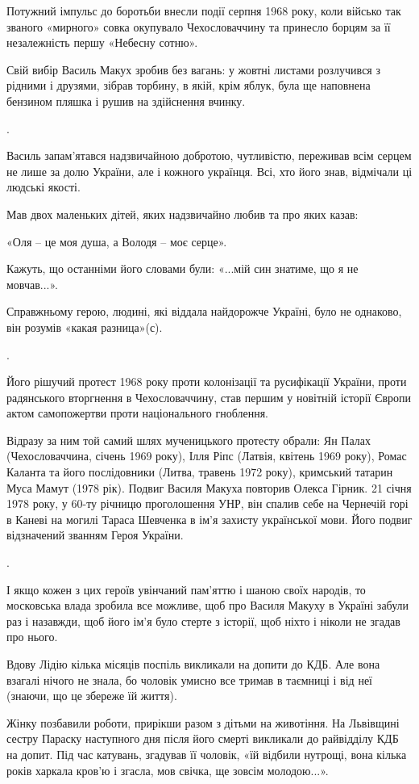 Потужний імпульс до боротьби внесли події серпня 1968 року, коли військо так
званого «мирного» совка окупувало Чехословаччину та принесло борцям за її
незалежність першу «Небесну сотню».

Свій вибір Василь Макух зробив без вагань: у жовтні листами розлучився з
рідними і друзями, зібрав торбину, в якій, крім яблук, була ще наповнена
бензином пляшка і рушив на здійснення вчинку.

.

Василь запам’ятався надзвичайною добротою, чутливістю, переживав всім серцем не
лише за долю України, але і кожного українця. Всі, хто його знав, відмічали ці
людські якості.

Мав двох маленьких дітей, яких надзвичайно любив та про яких казав:

«Оля – це моя душа, а Володя – моє серце».

Кажуть, що останніми його словами були: «...мій син знатиме, що я не
мовчав...».

Справжньому герою, людині, які віддала найдорожче Україні, було не однаково,
він розумів «какая разница»(с).

.

Його рішучий протест 1968 року проти колонізації та русифікації України, проти
радянського вторгнення в Чехословаччину, став першим у новітній історії Європи
актом самопожертви проти національного гноблення.

Відразу за ним той самий шлях мученицького протесту обрали: Ян Палах
(Чехословаччина, січень 1969 року), Ілля Ріпс (Латвія, квітень 1969 року),
Ромас Каланта та його послідовники (Литва, травень 1972 року), кримський
татарин Муса Мамут (1978 рік). Подвиг Василя Макуха повторив Олекса Гірник. 21
січня 1978 року, у 60-ту річницю проголошення УНР, він спалив себе на Чернечій
горі в Каневі на могилі Тараса Шевченка в ім’я захисту української мови. Його
подвиг відзначений званням Героя України.

.

І якщо кожен з цих героїв увінчаний пам'яттю і шаною своїх народів, то
московська влада зробила все можливе, щоб про Василя Макуху в Україні забули
раз і назавжди, щоб його ім’я було стерте з історії, щоб ніхто і ніколи не
згадав про нього.

Вдову Лідію кілька місяців поспіль викликали на допити до КДБ. Але вона взагалі
нічого не знала, бо чоловік умисно все тримав в таємниці і від неї (знаючи, що
це збереже їй життя).

Жінку позбавили роботи, прирікши разом з дітьми на животіння. На Львівщині
сестру Параску наступного дня після його смерті викликали до райвідділу КДБ на
допит. Під час катувань, згадував її чоловік, «їй відбили нутрощі, вона кілька
років харкала кров’ю і згасла, мов свічка, ще зовсім молодою...».

